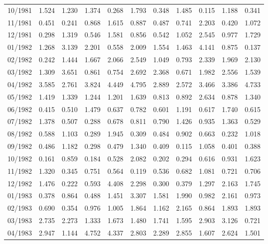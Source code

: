 \begin{tabular}{lrrrrrrrrrr}
10/1981 &  1.524 &  1.230 &  1.374 &  0.268 &  1.793 &  0.348 &  1.485 &  0.115 &  1.188 &  0.341 \\
11/1981 &  0.451 &  0.241 &  0.868 &  1.615 &  0.887 &  0.487 &  0.741 &  2.203 &  0.420 &  1.072 \\
12/1981 &  0.298 &  1.319 &  0.546 &  1.581 &  0.856 &  0.542 &  1.052 &  2.545 &  0.977 &  1.729 \\
01/1982 &  1.268 &  3.139 &  2.201 &  0.558 &  2.009 &  1.554 &  1.463 &  4.141 &  0.875 &  0.137 \\
02/1982 &  0.242 &  1.444 &  1.667 &  2.066 &  2.549 &  1.049 &  0.793 &  2.339 &  1.969 &  2.130 \\
03/1982 &  1.309 &  3.651 &  0.861 &  0.754 &  2.692 &  2.368 &  0.671 &  1.982 &  2.556 &  1.539 \\
04/1982 &  3.585 &  2.761 &  3.824 &  4.449 &  4.795 &  2.889 &  2.572 &  3.466 &  3.386 &  4.733 \\
05/1982 &  1.419 &  1.339 &  1.244 &  1.201 &  1.639 &  0.813 &  0.892 &  2.634 &  0.878 &  1.340 \\
06/1982 &  0.415 &  0.510 &  1.479 &  0.637 &  0.782 &  0.601 &  1.191 &  0.617 &  1.740 &  0.615 \\
07/1982 &  1.378 &  0.507 &  0.288 &  0.678 &  0.811 &  0.790 &  1.426 &  0.935 &  1.363 &  0.529 \\
08/1982 &  0.588 &  1.103 &  0.289 &  1.945 &  0.309 &  0.484 &  0.902 &  0.663 &  0.232 &  1.018 \\
09/1982 &  0.486 &  1.182 &  0.298 &  0.479 &  1.340 &  0.409 &  0.115 &  1.058 &  0.401 &  0.388 \\
10/1982 &  0.161 &  0.859 &  0.184 &  0.528 &  2.082 &  0.202 &  0.294 &  0.616 &  0.931 &  1.623 \\
11/1982 &  1.320 &  0.345 &  0.751 &  0.564 &  0.119 &  0.536 &  0.682 &  1.081 &  0.721 &  0.706 \\
12/1982 &  1.476 &  0.222 &  0.593 &  4.408 &  2.298 &  0.300 &  0.379 &  1.297 &  2.163 &  1.745 \\
01/1983 &  0.378 &  0.864 &  0.488 &  1.451 &  3.307 &  1.581 &  1.990 &  0.982 &  2.161 &  0.973 \\
02/1983 &  0.690 &  0.354 &  0.976 &  1.005 &  1.864 &  1.162 &  2.165 &  0.864 &  1.893 &  1.893 \\
03/1983 &  2.735 &  2.273 &  1.333 &  1.673 &  1.480 &  1.741 &  1.595 &  2.903 &  3.126 &  0.721 \\
04/1983 &  2.947 &  1.144 &  4.752 &  4.337 &  2.803 &  2.289 &  2.855 &  1.607 &  2.624 &  1.501 \\

\end{tabular}
